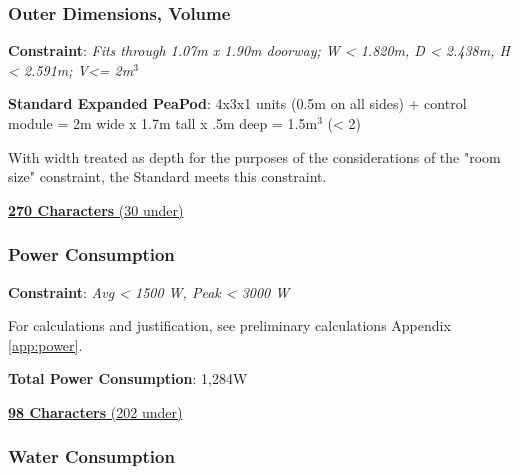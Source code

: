 \documentclass{../tex/report}
\begin{document}
\subsubsection{Outer Dimensions, Volume}
\label{sec:constraints-volume}

\textbf{Constraint}: \textit{Fits through 1.07m x 1.90m doorway; W < 1.820m, D < 2.438m, H < 2.591m; V<= 2m${}^3$}



\textbf{Standard Expanded PeaPod}: 4x3x1 units (0.5m on all sides) + control module = 2m wide x 1.7m tall x .5m deep = 1.5m${}^3$ (< 2)

With width treated as depth for the purposes of the considerations of the "room size" constraint, the Standard meets this constraint.

\uline{\textbf{270 Characters} (30 under)}

\vspace{0.5cm}

\subsubsection{Power Consumption}
\label{sec:constraints-power}

\textbf{Constraint}: \textit{Avg < 1500 W, Peak < 3000 W}

For calculations and justification, see preliminary calculations Appendix \ref{app:power}.

\textbf{Total Power Consumption}: 1,284W

\uline{\textbf{98 Characters} (202 under)}

\newpage

\subsubsection{Water Consumption}
\label{sec:constraints-water}
\end{document}
